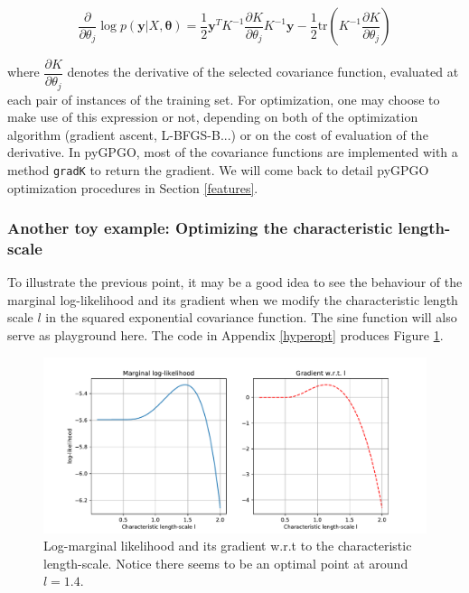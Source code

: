\documentclass[10pt,a4paper,twoside]{book}
\begin{document}
\begin{equation}
\dfrac{\partial}{\partial \theta_j}\log p(\boldsymbol{y}|X, \boldsymbol{\theta}) = \dfrac{1}{2}\boldsymbol{y}^T K^{-1}\dfrac{\partial K}{\partial \theta_j}K^{-1}\boldsymbol{y} - \dfrac{1}{2}\textrm{tr}\left(K^{-1} \dfrac{\partial K}{\partial \theta_j} \right)
\end{equation}

where $\dfrac{\partial K}{\partial \theta_j}$ denotes the derivative of the selected covariance function, evaluated at each pair of instances of the training set. For optimization, one may choose to make use of this expression or not, depending on both of the optimization algorithm (gradient ascent, L-BFGS-B...) or on the cost of evaluation of the derivative. In pyGPGO, most of the covariance functions are implemented with a method \texttt{gradK} to return the gradient. We will come back to detail pyGPGO optimization procedures in Section \ref{features}. 

\subsubsection{Another toy example: Optimizing the characteristic length-scale}

To illustrate the previous point, it may be a good idea to see the behaviour of the marginal log-likelihood and its gradient when we modify the characteristic length scale $l$ in the squared exponential covariance function. The sine function will also serve as playground here. The code in Appendix \ref{hyperopt} produces Figure \ref{fig:logmarginal}.


\begin{figure}
\caption{Log-marginal likelihood and its gradient w.r.t to the characteristic length-scale. Notice there seems to be an optimal point at around $l = 1.4$.}
\label{fig:logmarginal}
\includegraphics[width=\textwidth]{figures/chapter2/logmarginal}
\end{figure}
\end{document}
